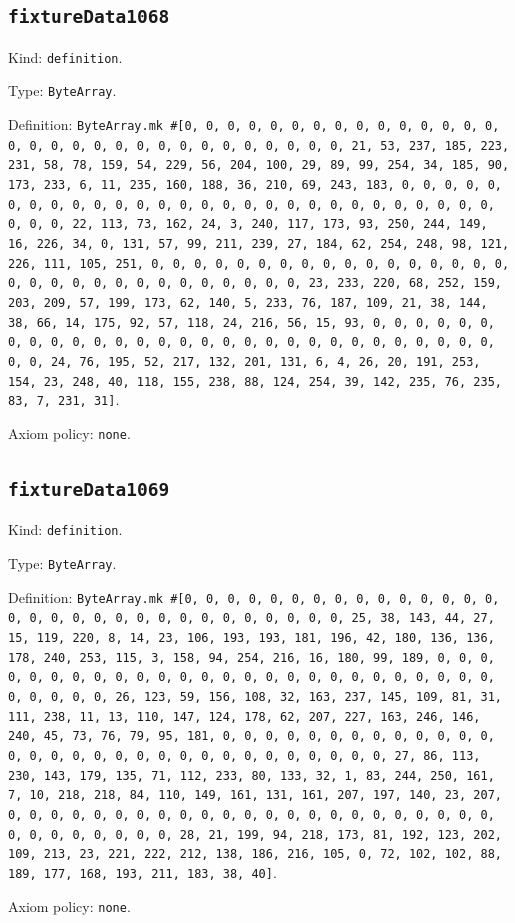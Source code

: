 \documentclass[11pt]{article}
\begin{document}
\subsection*{\texttt{fixtureData1068}}
\noindent Kind: \texttt{definition}.\par
\noindent Type: \texttt{ByteArray}.\par
\noindent Definition: \texttt{ByteArray.mk \#[0, 0, 0, 0, 0, 0, 0, 0, 0, 0, 0, 0, 0, 0, 0, 0, 0, 0, 0, 0, 0, 0, 0, 0, 0, 0, 0, 0, 0, 0, 0, 21, 53, 237, 185, 223, 231, 58, 78, 159, 54, 229, 56, 204, 100, 29, 89, 99, 254, 34, 185, 90, 173, 233, 6, 11, 235, 160, 188, 36, 210, 69, 243, 183, 0, 0, 0, 0, 0, 0, 0, 0, 0, 0, 0, 0, 0, 0, 0, 0, 0, 0, 0, 0, 0, 0, 0, 0, 0, 0, 0, 0, 0, 0, 0, 22, 113, 73, 162, 24, 3, 240, 117, 173, 93, 250, 244, 149, 16, 226, 34, 0, 131, 57, 99, 211, 239, 27, 184, 62, 254, 248, 98, 121, 226, 111, 105, 251, 0, 0, 0, 0, 0, 0, 0, 0, 0, 0, 0, 0, 0, 0, 0, 0, 0, 0, 0, 0, 0, 0, 0, 0, 0, 0, 0, 0, 0, 0, 0, 23, 233, 220, 68, 252, 159, 203, 209, 57, 199, 173, 62, 140, 5, 233, 76, 187, 109, 21, 38, 144, 38, 66, 14, 175, 92, 57, 118, 24, 216, 56, 15, 93, 0, 0, 0, 0, 0, 0, 0, 0, 0, 0, 0, 0, 0, 0, 0, 0, 0, 0, 0, 0, 0, 0, 0, 0, 0, 0, 0, 0, 0, 0, 0, 24, 76, 195, 52, 217, 132, 201, 131, 6, 4, 26, 20, 191, 253, 154, 23, 248, 40, 118, 155, 238, 88, 124, 254, 39, 142, 235, 76, 235, 83, 7, 231, 31]}.\par
\noindent Axiom policy: \texttt{none}.\par
\subsection*{\texttt{fixtureData1069}}
\noindent Kind: \texttt{definition}.\par
\noindent Type: \texttt{ByteArray}.\par
\noindent Definition: \texttt{ByteArray.mk \#[0, 0, 0, 0, 0, 0, 0, 0, 0, 0, 0, 0, 0, 0, 0, 0, 0, 0, 0, 0, 0, 0, 0, 0, 0, 0, 0, 0, 0, 0, 0, 25, 38, 143, 44, 27, 15, 119, 220, 8, 14, 23, 106, 193, 193, 181, 196, 42, 180, 136, 136, 178, 240, 253, 115, 3, 158, 94, 254, 216, 16, 180, 99, 189, 0, 0, 0, 0, 0, 0, 0, 0, 0, 0, 0, 0, 0, 0, 0, 0, 0, 0, 0, 0, 0, 0, 0, 0, 0, 0, 0, 0, 0, 0, 0, 26, 123, 59, 156, 108, 32, 163, 237, 145, 109, 81, 31, 111, 238, 11, 13, 110, 147, 124, 178, 62, 207, 227, 163, 246, 146, 240, 45, 73, 76, 79, 95, 181, 0, 0, 0, 0, 0, 0, 0, 0, 0, 0, 0, 0, 0, 0, 0, 0, 0, 0, 0, 0, 0, 0, 0, 0, 0, 0, 0, 0, 0, 0, 0, 27, 86, 113, 230, 143, 179, 135, 71, 112, 233, 80, 133, 32, 1, 83, 244, 250, 161, 7, 10, 218, 218, 84, 110, 149, 161, 131, 161, 207, 197, 140, 23, 207, 0, 0, 0, 0, 0, 0, 0, 0, 0, 0, 0, 0, 0, 0, 0, 0, 0, 0, 0, 0, 0, 0, 0, 0, 0, 0, 0, 0, 0, 0, 0, 28, 21, 199, 94, 218, 173, 81, 192, 123, 202, 109, 213, 23, 221, 222, 212, 138, 186, 216, 105, 0, 72, 102, 102, 88, 189, 177, 168, 193, 211, 183, 38, 40]}.\par
\noindent Axiom policy: \texttt{none}.\par
\end{document}
